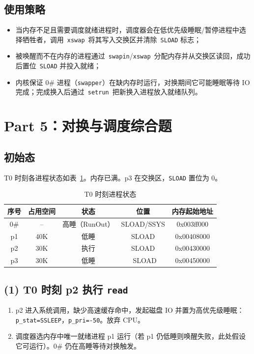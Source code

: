 \documentclass[11pt]{article}
\begin{document}
\subsection*{使用策略}
\begin{itemize}
  \item 当内存不足且需要调度就绪进程时，调度器会在低优先级睡眠/暂停进程中选择牺牲者，调用~\verb|xswap|~将其写入交换区并清除~\verb|SLOAD| 标志；
  \item 被唤醒而不在内存的进程通过~\verb|swapin|/\verb|xswap|~分配内存并从交换区读回，成功后置位~\verb|SLOAD| 并投入就绪；
  \item 内核保证 0# 进程（\verb|swapper|）在缺内存时运行，对换期间它可能睡眠等待 IO 完成；完成换入后通过~\verb|setrun|~把新换入进程放入就绪队列。
\end{itemize}

\section*{Part 5：对换与调度综合题}
\subsection*{初始态}
T0 时刻各进程状态如表~\ref{tab:init}。内存已满。p3 在交换区，\verb|SLOAD| 置位为 0。

\begin{table}[h]
\centering
\begin{tabular}{c|c|c|c|c}
\toprule
序号 & 占用空间 & 状态 & 位置 & 内存起始地址\\
\midrule
0\# & -- & 高睡（RunOut） & SLOAD/SSYS & 0x003ff000\\
p1 & 40K & 低睡 & SLOAD & 0x00408000\\
p2 & 30K & 执行 & SLOAD & 0x00430000\\
p3 & 30K & 低睡 & ~SLOAD & 0x00450000\\
\bottomrule
\end{tabular}
\caption{T0 时刻进程状态}
\label{tab:init}
\end{table}

\subsection*{(1) T0 时刻 p2 执行 \texttt{read}}
\begin{enumerate}
  \item p2 进入系统调用，缺少高速缓存命中，发起磁盘 IO 并置为高优先级睡眠：\verb|p_stat=SSLEEP|，\verb|p_pri=-50|。放弃 CPU。
  \item 调度器选内存中唯一就绪进程 p1 运行（若 p1 仍低睡则唤醒失败，此处假设它可运行）。0# 仍在高睡等待对换触发。
\end{enumerate}
\end{document}
